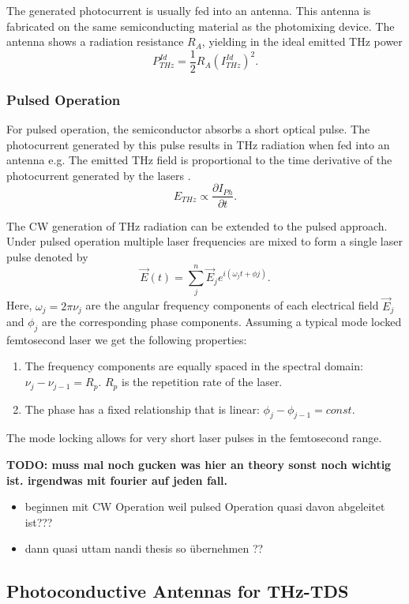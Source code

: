 The generated photocurrent is usually fed into an antenna. This antenna is fabricated on the same semiconducting material as the photomixing device. The antenna shows a radiation resistance $R_A$, yielding in the ideal emitted THz power 
\begin{equation}
	P_{THz}^{Id}=\frac{1}{2}R_A (I_{THz}^{Id})^2.
\end{equation}

\subsubsection{Pulsed Operation}

For pulsed operation, the semiconductor absorbs a short optical pulse. The photocurrent generated by this pulse results in THz radiation when fed into an antenna e.g. The emitted THz field is proportional to the time derivative of the photocurrent generated by the lasers \cite{preuTunableContinuouswaveTerahertz2011}.
\begin{equation}
	E_{THz} \propto \frac{\partial I_{Ph}}{\partial t}.
\end{equation}

The CW generation of THz radiation can be extended to the pulsed approach. Under pulsed operation multiple laser frequencies are mixed to form a single laser pulse denoted by 
\begin{equation}
	\vec{E}(t) = \sum_j^n \vec{E}_je^{i(\omega_j t + \phi j)}.
\end{equation}
Here, $\omega_j = 2 \pi \nu_j$ are the angular frequency components of each electrical field $\vec{E}_j$ and $\phi_j$ are the corresponding phase components. Assuming a typical mode locked femtosecond laser we get the following properties: 
\renewcommand{\labelenumi}{\alph{enumi})}
\begin{enumerate}
	\item The frequency components are equally spaced in the spectral domain: $\nu_j - \nu_{j-1} = R_p$. $R_p$ is the repetition rate of the laser.
	\item The phase has a fixed relationship that is linear: $\phi_j - \phi_{j-1} = const.$
\end{enumerate}

The mode locking allows for very short laser pulses in the femtosecond range.

\textbf{TODO: muss mal noch gucken was hier an theory sonst noch wichtig ist. irgendwas mit fourier auf jeden fall.}



\begin{itemize}
	\item beginnen mit CW Operation weil pulsed Operation quasi davon abgeleitet ist???
	\item dann quasi uttam nandi thesis so übernehmen ??
\end{itemize}

\subsection{Photoconductive Antennas for THz-TDS}
